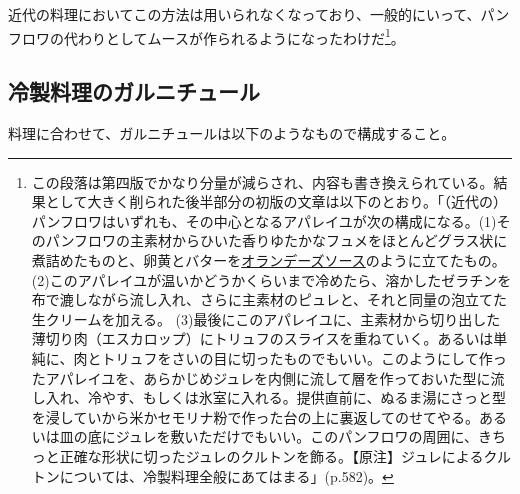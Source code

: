 近代の料理においてこの方法は用いられなくなっており、一般的にいって、パンフロワの代わりとしてムースが作られるようになったわけだ\footnote{この段落は第四版でかなり分量が減らされ、内容も書き換えられている。結果として大きく削られた後半部分の初版の文章は以下のとおり。「（近代の）パンフロワはいずれも、その中心となるアパレイユが次の構成になる。(1)そのパンフロワの主素材からひいた香りゆたかなフュメをほとんどグラス状に煮詰めたものと、卵黄とバターを\protect\hyperlink{sauce-hollandaise}{オランデーズソース}のように立てたもの。(2)このアパレイユが温いかどうかくらいまで冷めたら、溶かしたゼラチンを布で漉しながら流し入れ、さらに主素材のピュレと、それと同量の泡立てた生クリームを加える。
  (3)最後にこのアパレイユに、主素材から切り出した薄切り肉（エスカロップ）にトリュフのスライスを重ねていく。あるいは単純に、肉とトリュフをさいの目に切ったものでもいい。このようにして作ったアパレイユを、あらかじめジュレを内側に流して層を作っておいた型に流し入れ、冷やす、もしくは氷室に入れる。提供直前に、ぬるま湯にさっと型を浸していから米かセモリナ粉で作った台の上に裏返してのせてやる。あるいは皿の底にジュレを敷いただけでもいい。このパンフロワの周囲に、きちっと正確な形状に切ったジュレのクルトンを飾る。【原注】ジュレによるクルトンについては、冷製料理全般にあてはまる」(p.582)。}。

\hypertarget{garnitures-de-mets-froids}{%
\subsection{冷製料理のガルニチュール}\label{garnitures-de-mets-froids}}



料理に合わせて、ガルニチュールは以下のようなもので構成すること。

